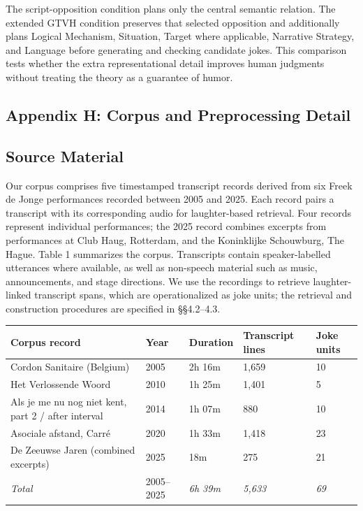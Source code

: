 \documentclass[11pt]{article}
\begin{document}
The script-opposition condition plans only the central semantic relation. The extended GTVH condition preserves that selected opposition and additionally plans Logical Mechanism, Situation, Target where applicable, Narrative Strategy, and Language before generating and checking candidate jokes. This comparison tests whether the extra representational detail improves human judgments without treating the theory as a guarantee of humor.

\subsection{Appendix H: Corpus and Preprocessing Detail}\label{appendix-h-corpus-and-preprocessing-detail}

\subsection{Source Material}\label{source-material-1}

Our corpus comprises five timestamped transcript records derived from six Freek de Jonge performances recorded between 2005 and 2025. Each record pairs a transcript with its corresponding audio for laughter-based retrieval. Four records represent individual performances; the 2025 record combines excerpts from performances at Club Haug, Rotterdam, and the Koninklijke Schouwburg, The Hague. Table 1 summarizes the corpus. Transcripts contain speaker-labelled utterances where available, as well as non-speech material such as music, announcements, and stage directions. We use the recordings to retrieve laughter-linked transcript spans, which are operationalized as joke units; the retrieval and construction procedures are specified in §§4.2--4.3.

\begin{table}[t]\centering\scriptsize\begin{tabularx}{\textwidth}{YYYYY}
\toprule\noalign{}
Corpus record & Year & Duration & Transcript lines & Joke units \\
\midrule\noalign{}

\bottomrule\noalign{}

Cordon Sanitaire (Belgium) & 2005 & 2h 16m & 1,659 & 10 \\
Het Verlossende Woord & 2010 & 1h 25m & 1,401 & 5 \\
Als je me nu nog niet kent, part 2 / after interval & 2014 & 1h 07m & 880 & 10 \\
Asociale afstand, Carré & 2020 & 1h 33m & 1,418 & 23 \\
De Zeeuwse Jaren (combined excerpts) & 2025 & 18m & 275 & 21 \\
\emph{Total} & 2005--2025 & \emph{6h 39m} & \emph{5,633} & \emph{69} \\
\end{tabularx}\end{table}
\end{document}
